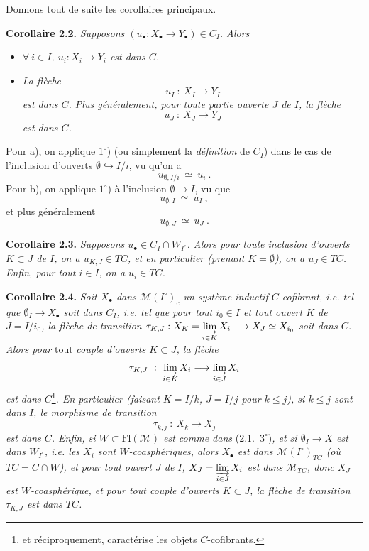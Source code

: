 \documentclass[11pt]{article}
\newcommand{\printedpage}[1]{\marginpar{\footnotesize p.~#1\ifstrequal{#1}{1}{\\[2pt]{[page 1]}}{}}}
\newcommand{\msp}[1]{\ifstrequal{#1}{page 1}{}{\marginpar{\footnotesize [#1]}}}
\newcommand{\Fl}{\mathrm{Fl}}
\newcommand{\M}{\mathcal{M}}
\begin{document}
Donnons tout de suite les corollaires principaux.

\textbf{Corollaire 2.2.} \textit{Supposons $(u_\bullet : X_\bullet \longrightarrow Y_\bullet) \in C_I$. Alors}
\begin{itemize}[leftmargin=3em]
\item[a)] \textit{$\forall\ i \in I$, $u_i : X_i \longrightarrow Y_i$ est dans $C$.}
\item[b)] \textit{La flèche}
\[
u_I \ :\ X_I \longrightarrow Y_I
\tag*{(2.2.1)}
\]
\textit{est dans $C$. Plus généralement, pour toute partie ouverte $J$ de $I$, la flèche}
\[
u_J \ :\ X_J \longrightarrow Y_J
\tag*{(2.2.2)}
\]
\textit{est dans $C$.}
\end{itemize}

\printedpage{16}

\msp{page 28}

Pour a), on applique $1^\circ$) (ou simplement la \textit{définition} de $C_I$) dans le cas de l'inclusion d'ouverts $\emptyset \hookrightarrow I/i$, vu qu'on a
\[
u_{\emptyset,I/i} \ \simeq\ u_i \ .
\]
Pour b), on applique $1^\circ$) à l'inclusion $\emptyset \longrightarrow I$, vu que
\[
u_{\emptyset,I} \ \simeq\ u_I \ ,
\]
et plus généralement
\[
u_{\emptyset,J} \ \simeq\ u_J \ .
\]

\textbf{Corollaire 2.3.} \textit{Supposons $u_\bullet \in C_I \cap W_{I^\circ}$. Alors pour toute inclusion d'ouverts $K \subset J$ de $I$, on a $u_{K,J} \in TC$, et en particulier (prenant $K = \emptyset$), on a $u_J \in TC$. Enfin, pour tout $i \in I$, on a $u_i \in TC$.}

\textbf{Corollaire 2.4.} \textit{Soit $X_\bullet$ dans $\M(I^\circ)_{\mathrm{c}}$ un système inductif $C$-cofibrant, i.e. tel que $\emptyset_I \longrightarrow X_\bullet$ soit dans $C_I$, i.e. tel que pour tout $i_0 \in I$ et tout ouvert $K$ de $J = I/i_0$, la flèche de transition $\tau_{K,J} : X_K = \varinjlim\limits_{i\in K} X_i \longrightarrow X_J \simeq X_{i_0}$ soit dans $C$. Alors pour} \textup{tout} \textit{couple d'ouverts $K \subset J$, la flèche}
\[
\tau_{K,J} \ :\ \varinjlim_{i\in K} X_i \longrightarrow \varinjlim_{i\in J} X_i
\]
\textit{est dans $C$}\footnote[12]{et réciproquement, caractérise les objets $C$-cofibrants.}\textit{. En particulier (faisant $K = I/k$, $J = I/j$ pour $k \leq j$), si $k \leq j$ sont dans $I$, le morphisme de transition}
\[
\tau_{k,j} \ :\ X_k \longrightarrow X_j
\]
\msp{page 29}
\textit{est dans $C$. Enfin, si $W \subset \Fl(\M)$ est comme dans} \textup{(2.1.\ $3^\circ$)}\textit{, et si $\emptyset_I \longrightarrow X$ est dans $W_{I^\circ}$, i.e. les $X_i$ sont $W$-coasphériques, alors $X_\bullet$ est dans $\M(I^\circ)_{TC}$ (où $TC = C \cap W$), et pour tout ouvert $J$ de $I$, $X_J = \varinjlim\limits_{i\in J} X_i$ est dans $\M_{TC}$, donc $X_J$ est $W$-coasphérique, et pour tout couple d'ouverts $K \subset J$, la flèche de transition $\tau_{K,J}$ est dans $TC$.}
\end{document}
